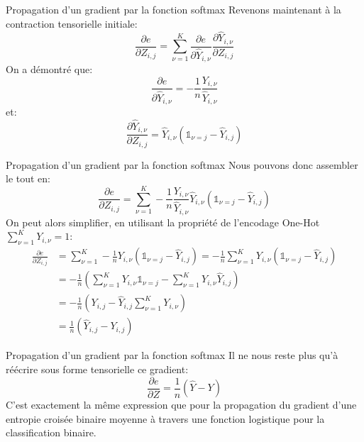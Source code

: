 \begin{frame}{Propagation d'un gradient par la fonction softmax}
	Revenons maintenant à la contraction tensorielle initiale:
	\begin{equation*}
		\frac{\partial{e}}{\partial{Z_{i,j}}} = \sum_{\nu=1}^K \frac{\partial{e}}{\partial{\hat{Y}_{i,\nu}}} 	\frac{\partial{\hat{Y}_{i,\nu}}}{\partial{Z_{i,j}}}
	\end{equation*}
	\pause
	On a démontré que:
	\begin{equation*}
		\frac{\partial{e}}{\partial{\hat{Y}_{i,\nu}}} = - \frac{1}{n} \frac{Y_{i,\nu}}{\hat{Y}_{i,\nu}}
	\end{equation*}	
	\pause
	et:
	\begin{equation*}
		\frac{\partial{\hat{Y}_{i,\nu}}}{\partial{Z_{i,j}}} = \hat{Y}_{i,\nu} \left(\mathbb{1}_{\nu=j} - \hat{Y}_{i,j}\right)
	\end{equation*}
\end{frame}

\begin{frame}{Propagation d'un gradient par la fonction softmax}
	Nous pouvons donc assembler le tout en:
	\begin{equation*}
		\frac{\partial{e}}{\partial{Z_{i,j}}} = \sum_{\nu=1}^K - \frac{1}{n} \frac{Y_{i,\nu}}{\hat{Y}_{i,\nu}} \hat{Y}_{i,\nu} \left(\mathbb{1}_{\nu=j} - \hat{Y}_{i,j}\right)
	\end{equation*}
	\pause
	On peut alors simplifier, en utilisant la propriété de l'encodage One-Hot $\sum_{\nu=1}^K Y_{i,\nu} = 1$:
	\begin{equation*}
		\begin{aligned}
			\frac{\partial{e}}{\partial{Z_{i,j}}} 
			&= \sum_{\nu=1}^K - \frac{1}{n} Y_{i,\nu} \left(\mathbb{1}_{\nu=j} - \hat{Y}_{i,j}\right)
			= - \frac{1}{n} \sum_{\nu=1}^K Y_{i,\nu} \left(\mathbb{1}_{\nu=j} - \hat{Y}_{i,j}\right) \\
			&= - \frac{1}{n} \left(\sum_{\nu=1}^K Y_{i,\nu} \mathbb{1}_{\nu=j} - \sum_{\nu=1}^K Y_{i,\nu} \hat{Y}_{i,j} \right) \\
			&= - \frac{1}{n} \left(Y_{i,j} - \hat{Y}_{i,j} \sum_{\nu=1}^K Y_{i,\nu} \right) \\
			&= \frac{1}{n} \left(\hat{Y}_{i,j} - Y_{i,j} \right)
		\end{aligned}
	\end{equation*}	
\end{frame}

\begin{frame}{Propagation d'un gradient par la fonction softmax}
	Il ne nous reste plus qu'à réécrire sous forme tensorielle ce gradient:
	\begin{equation*}
		\frac{\partial{e}}{\partial{Z}} = \frac{1}{n} \left(\hat{Y} - Y \right)
	\end{equation*}
	C'est exactement la même expression que pour la propagation du gradient d'une entropie croisée binaire moyenne à travers une fonction logistique pour la classification binaire.
\end{frame}